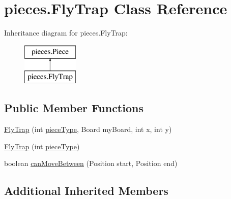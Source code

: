 \hypertarget{classpieces_1_1_fly_trap}{\section{pieces.\-Fly\-Trap Class Reference}
\label{classpieces_1_1_fly_trap}
}
Inheritance diagram for pieces.\-Fly\-Trap\-:\begin{figure}[H]
\begin{center}
\leavevmode
\includegraphics[height=2.000000cm]{classpieces_1_1_fly_trap}
\end{center}
\end{figure}
\subsection*{Public Member Functions}
\begin{DoxyCompactItemize}
\item 
\hyperlink{classpieces_1_1_fly_trap_aa8047ea9187379cf8aaa37773a5b53a0}{Fly\-Trap} (int \hyperlink{classpieces_1_1_piece_ae40d6201d0aed36f369dd9d8f55892e3}{piece\-Type}, Board my\-Board, int x, int y)
\item 
\hyperlink{classpieces_1_1_fly_trap_a699d7d74ce789d38aa3531d69c055537}{Fly\-Trap} (int \hyperlink{classpieces_1_1_piece_ae40d6201d0aed36f369dd9d8f55892e3}{piece\-Type})
\item 
boolean \hyperlink{classpieces_1_1_fly_trap_a36e41ba9c72806f3e93f7853270c0d41}{can\-Move\-Between} (Position start, Position end)
\end{DoxyCompactItemize}
\subsection*{Additional Inherited Members}


